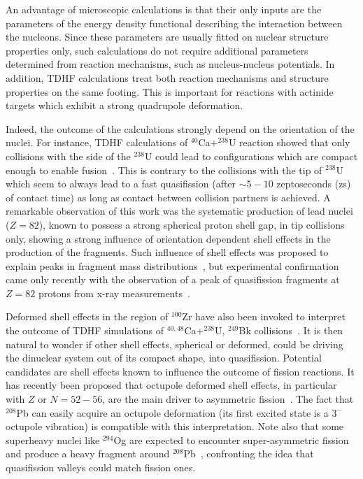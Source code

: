 An advantage of microscopic calculations is that their only inputs are the parameters of the energy density functional describing the interaction between the nucleons.
Since these parameters are usually fitted on nuclear structure properties only, such calculations do not require additional parameters determined from reaction mechanisms, such as nucleus-nucleus potentials.
In addition, TDHF calculations treat both reaction mechanisms and structure properties on the same footing.
This is important for reactions with actinide targets which exhibit a strong quadrupole deformation.

Indeed, the outcome of the calculations strongly depend on the orientation of the nuclei.
For instance, TDHF calculations of $^{40}$Ca$+^{238}$U reaction showed that only collisions with the side of the $^{238}$U could lead to configurations which are compact enough to enable fusion~\citep{wakhle2014}.
This is contrary to the collisions with the tip of $^{238}$U which seem to always lead to a fast quasifission (after $\sim5-10$ zeptoseconds (zs) of contact time) as long as contact between collision partners is achieved.
A remarkable observation of this work was the systematic production of lead nuclei ($Z=82$), known to possess a strong spherical proton shell gap, in tip collisions only, showing a strong influence of orientation dependent shell effects in the production of the fragments.
Such influence of shell effects was proposed to explain peaks in fragment mass distributions~\citep{itkis2004,nishio2008,wakhle2014}, but experimental confirmation came only recently with the observation of a peak of quasifission fragments at $Z=82$ protons from x-ray measurements~\citep{morjean2017}.

Deformed shell effects in the region of $^{100}$Zr have also been invoked to interpret the outcome of TDHF simulations of $^{40,48}$Ca+$^{238}$U, $^{249}$Bk collisions~\citep{oberacker2014,umar2016}.
It is then natural to wonder if other shell effects, spherical or deformed, could be driving the dinuclear system out of its compact shape, into quasifission.
Potential candidates are shell effects known to influence the outcome of fission reactions.
It has recently been proposed that octupole deformed shell effects, in particular with $Z$ or $N=52-56$, are the main driver to asymmetric fission~\citep{scamps2018,scamps2019}.
The fact that $^{208}$Pb can easily acquire an octupole deformation (its first excited state is a $3^-$ octupole vibration) is compatible with this interpretation.
Note also that some superheavy nuclei like $^{294}$Og are expected to encounter super-asymmetric fission and produce a heavy fragment around $^{208}$Pb~\citep{poenaru2018,warda2018,matheson2019,zhang2018}, confronting the idea that quasifission valleys could match fission ones.

